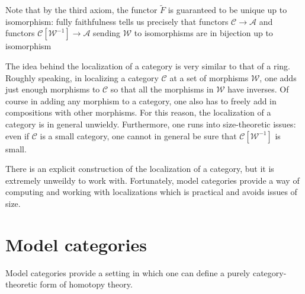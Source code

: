 \documentclass[main.tex]{subfiles}
\begin{document}
Note that by the third axiom, the functor $\tilde{F}$ is guaranteed to be unique up to isomorphism: fully faithfulness tells us precisely that functors $\mathcal{C} \to \mathcal{A}$ and functors $\mathcal{C}[\mathcal{W}^{-1}] \to \mathcal{A}$ sending $\mathcal{W}$ to isomorphisms are in bijection up to isomorphism

The idea behind the localization of a category is very similar to that of a ring. Roughly speaking, in localizing a category $\mathcal{C}$ at a set of morphisms $\mathcal{W}$, one adds just enough morphisms to $\mathcal{C}$ so that all the morphisms in $\mathcal{W}$ have inverses. Of course in adding any morphism to a category, one also has to freely add in compositions with other morphisms. For this reason, the localization of a category is in general unwieldy. Furthermore, one runs into size-theoretic issues: even if $\mathcal{C}$ is a small category, one cannot in general be sure that $\mathcal{C}[\mathcal{W}^{-1}]$ is small.

There is an explicit construction of the localization of a category, but it is extremely unweildy to work with. Fortunately, model categories provide a way of computing and working with localizations which is practical and avoids issues of size.

\section{Model categories}
\label{sec:model_categories}

Model categories provide a setting in which one can define a purely category-theoretic form of homotopy theory.
\end{document}
